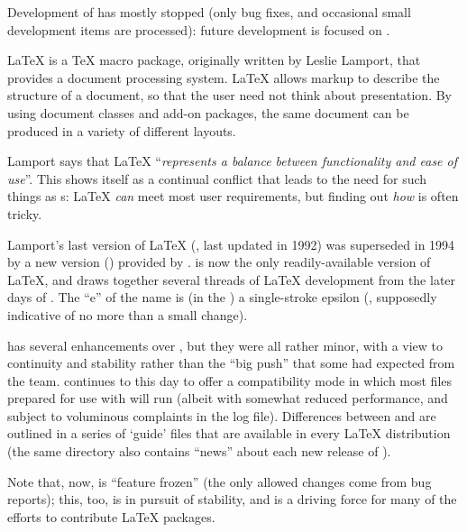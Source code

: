 Development of \PDFTeX{} has mostly stopped (only bug fixes, and
occasional small development items are processed): future development
is focused on .


\LaTeX{} is a \TeX{} macro package, originally written by Leslie Lamport, that
provides a document processing system.  \LaTeX{} allows markup to
describe the structure of a document, so that the user
need not think about presentation. By using document classes and
add-on packages, the same document can be produced in a variety of
different layouts.

Lamport says that \LaTeX{}
``\emph{represents a balance between functionality and ease of use}''.
This shows itself as a continual conflict that leads to
the need for such things as s: \LaTeX{} \emph{can} 
meet most user requirements, but finding out \emph{how} is often
tricky.


Lamport's last version of \LaTeX{} (\LaTeXo{}, last updated in 1992)
was superseded in 1994 by a new version (\LaTeXe{}) provided by
.
\LaTeXe{} is now the only readily-available version of
\LaTeX{}, and draws together several threads of \LaTeX{} development
from the later days of \LaTeXo{}.  The ``e'' of the name is (in the
)
a single-stroke epsilon
(, supposedly
indicative of no more than a small change).

\LaTeXe{} has several enhancements over \LaTeXo{}, but they were all
rather minor, with a view to continuity and stability rather than the
``big push'' that some had expected from the team.  \LaTeXe{}
continues to this day to offer a compatibility mode in which most
files prepared for use with \LaTeXo{} will run (albeit with somewhat
reduced performance, and subject to voluminous complaints in the log
file).  Differences between \LaTeXe{} and \LaTeXo{} are
outlined in a series of `guide' files that are available in every
\LaTeX{} distribution (the same directory also contains ``news'' about
each new release of \LaTeXe{}).

Note that, now, \LaTeXe{} is ``feature frozen'' (the only allowed
changes come from bug reports); this, too, is in pursuit of stability,
and is a driving force for many of the efforts to contribute \LaTeX{}
packages.
\begin{ctanrefs}
\item[\nothtml{\rmfamily}\LaTeX{} guides and news]
\end{ctanrefs}

